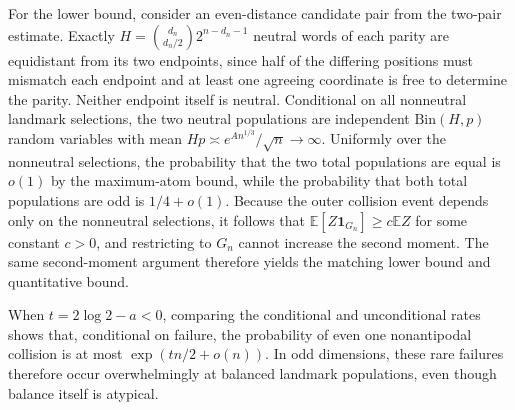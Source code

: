 For the lower bound, consider an even-distance candidate pair from the two-pair estimate. Exactly $H=\binom{d_n}{d_n/2}2^{n-d_n-1}$ neutral words of each parity are equidistant from its two endpoints, since half of the differing positions must mismatch each endpoint and at least one agreeing coordinate is free to determine the parity. Neither endpoint itself is neutral. Conditional on all nonneutral landmark selections, the two neutral populations are independent $\mathrm{Bin}(H,p)$ random variables with mean $Hp\asymp e^{An^{1/3}}/\sqrt n\to\infty$. Uniformly over the nonneutral selections, the probability that the two total populations are equal is $o(1)$ by the maximum-atom bound, while the probability that both total populations are odd is $1/4+o(1)$. Because the outer collision event depends only on the nonneutral selections, it follows that $\mathbb E[Z\mathbf1_{G_n}]\ge c\mathbb EZ$ for some constant $c>0$, and restricting to $G_n$ cannot increase the second moment. The same second-moment argument therefore yields the matching lower bound and quantitative bound.

When $t=2\log2-a<0$, comparing the conditional and unconditional rates shows that, conditional on failure, the probability of even one nonantipodal collision is at most $\exp(tn/2+o(n))$. In odd dimensions, these rare failures therefore occur overwhelmingly at balanced landmark populations, even though balance itself is atypical.

